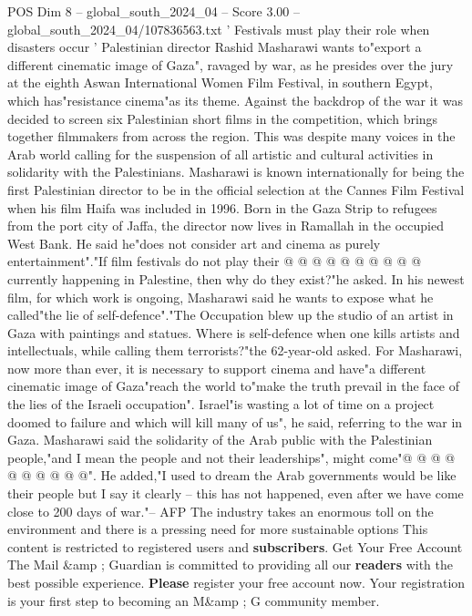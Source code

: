 \begin{textsample}{POS Dim 8 – global\_south\_2024\_04 – Score 3.00 – global\_south\_2024\_04/107836563.txt}  \label{ex:f8_pos_416}
' Festivals must play their role when disasters occur ' Palestinian director Rashid Masharawi wants to"export a different cinematic image of Gaza", ravaged by war, as he presides over the jury at the eighth Aswan International Women Film Festival, in southern Egypt, which has"resistance cinema"as its theme.
Against the backdrop of the war it was decided to screen six Palestinian short films in the competition, which brings together filmmakers from across the region.
This was despite many voices in the Arab world calling for the suspension of all artistic and cultural activities in solidarity with the Palestinians.
Masharawi is known internationally for being the first Palestinian director to be in the official selection at the Cannes Film Festival when his film Haifa was included in 1996.
Born in the Gaza Strip to refugees from the port city of Jaffa, the director now lives in Ramallah in the occupied West Bank.
He said he"does not consider art and cinema as purely entertainment"."If film festivals do not play their @ @ @ @ @ @ @ @ @ @ currently happening in Palestine, then why do they exist?"he asked.
In his newest film, for which work is ongoing, Masharawi said he wants to expose what he called"the lie of self-defence"."The Occupation blew up the studio of an artist in Gaza with paintings and statues.
Where is self-defence when one kills artists and intellectuals, while calling them terrorists?"the 62-year-old asked.
For Masharawi, now more than ever, it is necessary to support cinema and have"a different cinematic image of Gaza"reach the world to"make the truth prevail in the face of the lies of the Israeli occupation".
Israel"is wasting a lot of time on a project doomed to failure and which will kill many of us", he said, referring to the war in Gaza.
Masharawi said the solidarity of the Arab public with the Palestinian people,"and I mean the people and not their leaderships", might come"@ @ @ @ @ @ @ @ @ @".
He added,"I used to dream the Arab governments would be like their people but I say it clearly -- this has not happened, even after we have come close to 200 days of war."-- AFP The industry takes an enormous toll on the environment and there is a pressing need for more sustainable options This content is restricted to registered users and \textbf{subscribers}.
Get Your Free Account The Mail \&amp ; Guardian is committed to providing all our \textbf{readers} with the best possible experience. \textbf{Please} register your free account now.
Your registration is your first step to becoming an M\&amp ; G community member.

\end{textsample}
